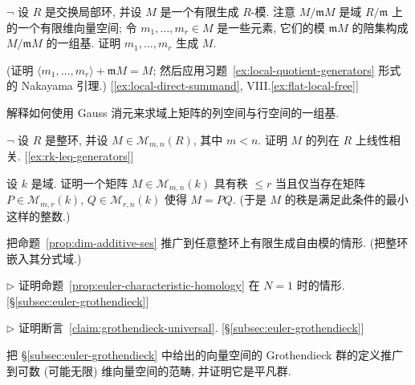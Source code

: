 \begin{prob}
\label{ex:local-nakayama-gen}
$\neg$ 设 $R$ 是交换局部环, 并设 $M$ 是一个有限生成 $R$-模. 注意 $M/\mathfrak{m}M$ 是域 $R/\mathfrak{m}$ 上的一个有限维向量空间; 令 $m_1,\ldots,m_r\in M$ 是一些元素, 它们的模 $\mathfrak{m}M$ 的陪集构成 $M/\mathfrak{m}M$ 的一组基. 证明 $m_1,\ldots,m_r$ 生成 $M$.

(证明 $\langle m_1,\ldots,m_r\rangle+\mathfrak{m}M=M$; 然后应用习题~\ref{ex:local-quotient-generators} 形式的 Nakayama 引理.) [\ref{ex:local-direct-summand}, VIII.\ref{ex:flat-local-free}]
\end{prob}

\begin{prob}
\label{ex:gaussian-row-col-space-bases}
解释如何使用 Gauss 消元来求域上矩阵的列空间与行空间的一组基.
\end{prob}

\begin{prob}
\label{ex:more-cols-than-rows-dependent}
$\neg$ 设 $R$ 是整环, 并设 $M\in\mathcal{M}_{m,n}(R)$, 其中 $m<n$. 证明 $M$ 的列在 $R$ 上线性相关. [\ref{ex:rk-leq-generators}]
\end{prob}

\begin{prob}
\label{ex:rank-factorization}
设 $k$ 是域. 证明一个矩阵 $M\in\mathcal{M}_{m,n}(k)$ 具有秩 $\le r$ 当且仅当存在矩阵 $P\in\mathcal{M}_{m,r}(k)$, $Q\in\mathcal{M}_{r,n}(k)$ 使得 $M=PQ$. (于是 $M$ 的秩是满足此条件的最小这样的整数.)
\end{prob}

\begin{prob}
\label{ex:dim-additive-free-modules}
把命题~\ref{prop:dim-additive-ses} 推广到任意整环上有限生成自由模的情形. (把整环嵌入其分式域.)
\end{prob}

\begin{prob}
\label{ex:euler-char-N1}
$\triangleright$ 证明命题~\ref{prop:euler-characteristic-homology} 在 $N=1$ 时的情形. [§\ref{subsec:euler-grothendieck}]
\end{prob}

\begin{prob}
\label{ex:grothendieck-claim-proof}
$\triangleright$ 证明断言~\ref{claim:grothendieck-universal}. [§\ref{subsec:euler-grothendieck}]
\end{prob}

\begin{prob}
\label{ex:grothendieck-infinite-dim}
把 §\ref{subsec:euler-grothendieck} 中给出的向量空间的 Grothendieck 群的定义推广到可数 (可能无限) 维向量空间的范畴, 并证明它是平凡群.
\end{prob}

